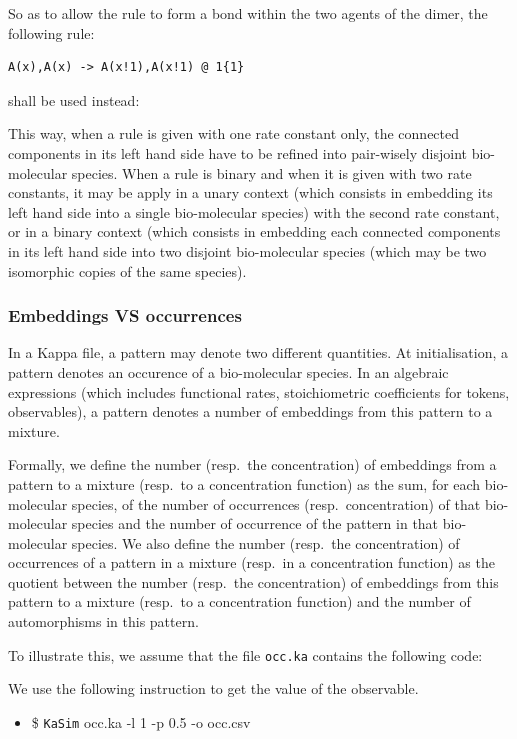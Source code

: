 \documentclass[11pt]{book}
\def\ttt#1{\texttt{#1}}
\def\ITE#1{\begin{itemize}#1\end{itemize}}
\begin{document}
  So as to allow the rule to form a bond within the two agents of the dimer, the following rule:
  \begin{lstlisting}[language=kappa]
A(x),A(x) -> A(x!1),A(x!1) @ 1{1}
  \end{lstlisting}
   shall be used instead:

  This way, when a rule is given with one rate constant only, the connected components in its left hand side have to be refined into pair-wisely disjoint bio-molecular species. When a rule is binary and when it is given with two rate constants,  it may be apply in a unary context (which consists in embedding its left hand side into a single bio-molecular species) with the second rate constant, or in a binary context (which consists in embedding each connected components in its left hand side into two disjoint bio-molecular species (which may be two isomorphic copies of the same species).

  \subsubsection{Embeddings VS occurrences}

In a Kappa file, a pattern may denote two different quantities.
At initialisation, a pattern denotes an occurence of a bio-molecular species. In an algebraic expressions (which includes functional rates,
stoichiometric coefficients for tokens, observables), a pattern denotes a number of embeddings from this pattern to a mixture.

Formally, we define the number (resp.~the concentration) of embeddings from a pattern to a mixture (resp.~to a concentration function) as
the sum, for each bio-molecular species,
 of the number of occurrences (resp.~concentration) of that bio-molecular species and the number of occurrence of the pattern in that bio-molecular species. We also define the number (resp.~the concentration) of occurrences of a pattern in a mixture (resp.~in a concentration function) as the quotient between the number (resp.~the concentration) of embeddings from this pattern to a mixture (resp.~to a concentration function) and the number of automorphisms in this pattern.

To illustrate this, we assume that the file \texttt{occ.ka} contains the following code:

We use the following instruction to get the value of the observable.
\ITE{\item[\$] \ttt{KaSim} occ.ka -l 1 -p 0.5 -o occ.csv}
\end{document}
